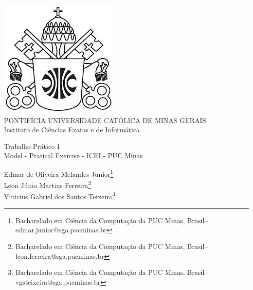 \documentclass[a4paper,12pt,Times]{article}
\makeatletter
\newcommand{\monog}{Trabalho Prático 1}
\newcommand{\monogES}{Model - Pratical Exercise - ICEI - PUC Minas}
\newcommand{\origem}{Brasil}
\newcommand{\AutorA}{Edmar de Oliveira Melandes Junior}
\newcommand{\funcaoA}{}
\newcommand{\emailA}{edmar.junior@sga.pucminas.br}
\newcommand{\cursA}{Bacharelado em Ciência da Computação da PUC Minas}
\newcommand{\AutorB}{Leon Júnio Martins Ferreira}
\newcommand{\funcaoB}{}
\newcommand{\emailB}{leon.ferreira@sga.pucminas.br}
\newcommand{\cursB}{Bacharelado em Ciência da Computação da PUC Minas}
\newcommand{\AutorC}{Vinicius Gabriel dos Santos Teixeira}
\newcommand{\funcaoC}{}
\newcommand{\emailC}{vgsteixeira@sga.pucminas.br}
\newcommand{\cursC}{Bacharelado em Ciência da Computação da PUC Minas}
\makeatother
\begin{document}

\begin{flushleft}

\begin{minipage} [c][3cm][b]{16.5cm} %
\begin{center}
\centering
\includegraphics[scale=0.3]{figuras/brasao.jpg} \\
PONTIFÍCIA UNIVERSIDADE CATÓLICA DE MINAS GERAIS \\
Instituto de Ciências Exatas e de Informática \\
\end{center}
\end{minipage}

\vspace{1.5cm} %

 \vspace{0cm} {
 \singlespacing \Large{\monog {} \\ }
  \normalsize{\monogES}
 }
\end{flushleft}
\begin{flushright}
\singlespacing 
\normalsize{\AutorA \footnote{\funcaoA \cursA, \origem -- \emailA }} \\
\normalsize{\AutorB \footnote{\funcaoB \cursB, \origem -- \emailB }} \\
\normalsize{\AutorC \footnote{\funcaoC \cursC, \origem -- \emailC }} \\
\end{flushright}
\thispagestyle{empty}
\end{document}
